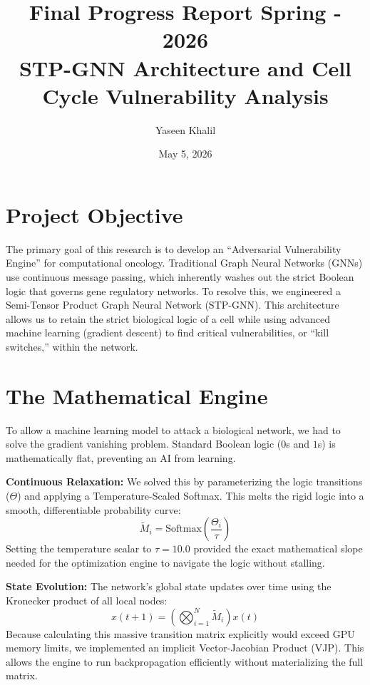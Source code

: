 \documentclass[11pt, letterpaper]{article}
\title{Final Progress Report Spring - 2026 \\ \large STP-GNN Architecture and Cell Cycle Vulnerability Analysis}
\author{Yaseen Khalil}
\date{May 5, 2026}
\begin{document}
	
	\maketitle
	
	
	\section{Project Objective}
	The primary goal of this research is to develop an ``Adversarial Vulnerability Engine'' for computational oncology. Traditional Graph Neural Networks (GNNs) use continuous message passing, which inherently washes out the strict Boolean logic that governs gene regulatory networks. To resolve this, we engineered a Semi-Tensor Product Graph Neural Network (STP-GNN). This architecture allows us to retain the strict biological logic of a cell while using advanced machine learning (gradient descent) to find critical vulnerabilities, or ``kill switches,'' within the network.
	
	\section{The Mathematical Engine}
	To allow a machine learning model to attack a biological network, we had to solve the gradient vanishing problem. Standard Boolean logic ($0$s and $1$s) is mathematically flat, preventing an AI from learning. 
	
	\textbf{Continuous Relaxation:} We solved this by parameterizing the logic transitions ($\Theta$) and applying a Temperature-Scaled Softmax. This melts the rigid logic into a smooth, differentiable probability curve:
	\begin{equation}
		\tilde{M}_i = \text{Softmax}\left(\frac{\Theta_i}{\tau}\right)
	\end{equation}
	Setting the temperature scalar to $\tau = 10.0$ provided the exact mathematical slope needed for the optimization engine to navigate the logic without stalling.
	
	\textbf{State Evolution:} The network's global state updates over time using the Kronecker product of all local nodes:
	\begin{equation}
		x(t+1) = \left( \bigotimes_{i=1}^{N} \tilde{M}_i \right) x(t)
	\end{equation}
	Because calculating this massive transition matrix explicitly would exceed GPU memory limits, we implemented an implicit Vector-Jacobian Product (VJP). This allows the engine to run backpropagation efficiently without materializing the full matrix.
	
\end{document}
